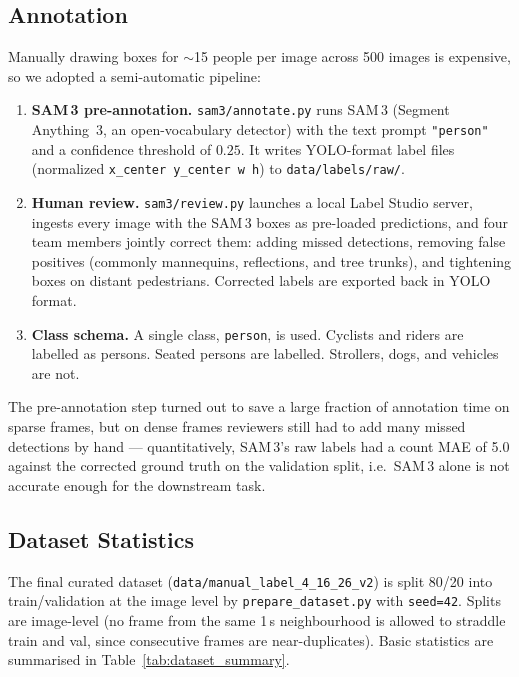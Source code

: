 \documentclass{article}
\begin{document}
\subsection{Annotation}
Manually drawing boxes for $\sim$15 people per image across 500
images is expensive, so we adopted a semi-automatic pipeline:
\begin{enumerate}[leftmargin=1.5em]
    \item \textbf{SAM\,3 pre-annotation.}
    \texttt{sam3/annotate.py} runs SAM\,3 (Segment Anything~3,
    an open-vocabulary detector) with the text prompt
    \texttt{"person"} and a confidence threshold of $0.25$.
    It writes YOLO-format label files (normalized
    \texttt{x\_center y\_center w h}) to \texttt{data/labels/raw/}.
    \item \textbf{Human review.}
    \texttt{sam3/review.py} launches a local Label Studio server,
    ingests every image with the SAM\,3 boxes as pre-loaded
    predictions, and four team members jointly correct them:
    adding missed detections, removing false positives (commonly
    mannequins, reflections, and tree trunks), and tightening
    boxes on distant pedestrians. Corrected labels are exported
    back in YOLO format.
    \item \textbf{Class schema.} A single class, \texttt{person},
    is used. Cyclists and riders are labelled as persons. Seated
    persons are labelled. Strollers, dogs, and vehicles are not.
\end{enumerate}
The pre-annotation step turned out to save a large fraction of
annotation time on sparse frames, but on dense frames reviewers
still had to add many missed detections by hand --- quantitatively,
SAM\,3's raw labels had a count MAE of 5.0 against the corrected
ground truth on the validation split, i.e.\ SAM\,3 alone is not
accurate enough for the downstream task.

\subsection{Dataset Statistics}
The final curated dataset (\texttt{data/manual\_label\_4\_16\_26\_v2})
is split 80/20 into train/validation at the image level by
\texttt{prepare\_dataset.py} with \texttt{seed=42}. Splits are
image-level (no frame from the same 1\,s neighbourhood is allowed
to straddle train and val, since consecutive frames are
near-duplicates). Basic statistics are summarised in
Table~\ref{tab:dataset_summary}.
\end{document}
